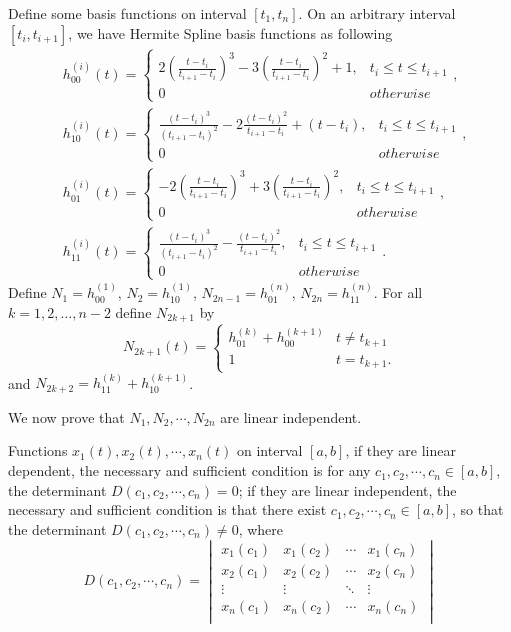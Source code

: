 Define some basis functions on interval $[t_1,t_n]$. On an arbitrary interval $[t_i,t_{i+1}]$, we have Hermite Spline basis functions as following
\begin{align*}
&h_{00}^{(i)}(t)=
\begin{cases}
2(\frac{t-t_{i}}{t_{i+1}-t_{i}})^3-3(\frac{t-t_{i}}{t_{i+1}-t_{i}})^2+1, & t_i\leq t \leq t_{i+1} \\ 
0 & otherwise
\end{cases}, \\
&h_{10}^{(i)}(t)=\begin{cases}
\frac{(t-t_{i})^3}{(t_{i+1}-t_{i})^2}-2\frac{(t-t_{i})^2}{t_{i+1}-t_{i}}+(t-t_{i}), & t_i\leq t \leq t_{i+1} \\ 
0 &  otherwise
\end{cases},\\
&h_{01}^{(i)}(t)=
\begin{cases}
-2(\frac{t-t_i}{t_{i+1}-t_i})^3+3(\frac{t-t_i}{t_{i+1}-t_i})^2, & t_i\leq t \leq t_{i+1} \\ 
0 &  otherwise
\end{cases},\\
&h_{11}^{(i)}(t)=\begin{cases}
\frac{(t-t_i)^3}{(t_{i+1}-t_i)^2}-\frac{(t-t_i)^2}{t_{i+1}-t_i}, & t_i\leq t \leq t_{i+1} \\ 
0 &  otherwise
\end{cases}.
\end{align*}
 Define $N_1 = h^{(1)}_{00}$, $N_2 = h^{(1)}_{10}$, $N_{2n-1} = h_{01}^{(n)}$, $N_{2n} = h_{11}^{(n)}$. For all $k=1,2,\ldots,n-2$ define $N_{2k+1}$ by
\[N_{2k+1}(t) = \begin{cases} h_{01}^{(k)}+h_{00}^{(k+1)} & t \neq t_{k+1} \\ 1 & t = t_{k+1}.\end{cases}\]
and $N_{2k+2} = h_{11}^{(k)}+h_{10}^{(k+1)}$.

We now prove that $N_1, N_2, \cdots, N_{2n}$ are linear independent. 
\begin{lemma}\cite{peng1983}
Functions $x_1(t),x_2(t),\cdots,x_n(t)$ on interval $[a,b]$, if they are linear dependent, the necessary and sufficient condition is for any $c_1,c_2,\cdots,c_n \in [a,b]$, the determinant $D(c_1,c_2,\cdots,c_n)=0$; if they are linear independent, the necessary and sufficient condition is that there exist $c_1,c_2,\cdots,c_n \in [a,b]$, so that the determinant $D(c_1,c_2,\cdots,c_n) \neq 0$, where 
\begin{equation*}
D(c_1,c_2,\cdots,c_n)=
\begin{vmatrix}
x_1(c_1) & x_1(c_2) & \cdots& x_1(c_n)\\
x_2(c_1) & x_2(c_2)& \cdots & x_2(c_n)\\
 \vdots  &  \vdots  & \ddots  & \vdots  \\  
x_n(c_1) & x_n(c_2) & \cdots & x_n(c_n)\\
\end{vmatrix}
\end{equation*}
\end{lemma}


